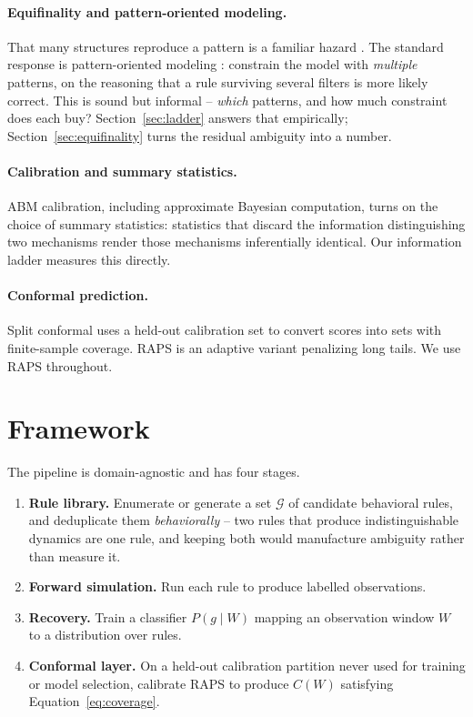 \documentclass[11pt]{article}
\begin{document}
\paragraph{Equifinality and pattern-oriented modeling.}
That many structures reproduce a pattern is a familiar hazard \citep{beven2006}. The
standard response is pattern-oriented modeling \citep{grimm2005}: constrain the model
with \emph{multiple} patterns, on the reasoning that a rule surviving several filters
is more likely correct. This is sound but informal -- \emph{which} patterns, and how
much constraint does each buy? Section~\ref{sec:ladder} answers that empirically;
Section~\ref{sec:equifinality} turns the residual ambiguity into a number.

\paragraph{Calibration and summary statistics.}
ABM calibration, including approximate Bayesian computation, turns on the choice of
summary statistics: statistics that discard the information distinguishing two
mechanisms render those mechanisms inferentially identical. Our information ladder
measures this directly.

\paragraph{Conformal prediction.}
Split conformal \citep{vovk2005} uses a held-out calibration set to convert scores
into sets with finite-sample coverage. RAPS \citep{angelopoulos2021} is an adaptive
variant penalizing long tails. We use RAPS throughout.

\section{Framework}

The pipeline is domain-agnostic and has four stages.

\begin{enumerate}
\itemsep2pt
\item \textbf{Rule library.} Enumerate or generate a set $\mathcal{G}$ of candidate
behavioral rules, and deduplicate them \emph{behaviorally} -- two rules that produce
indistinguishable dynamics are one rule, and keeping both would manufacture ambiguity
rather than measure it.
\item \textbf{Forward simulation.} Run each rule to produce labelled observations.
\item \textbf{Recovery.} Train a classifier $P(g \mid W)$ mapping an observation
window $W$ to a distribution over rules.
\item \textbf{Conformal layer.} On a held-out calibration partition never used for
training or model selection, calibrate RAPS to produce $C(W)$ satisfying
Equation~\ref{eq:coverage}.
\end{enumerate}
\end{document}
